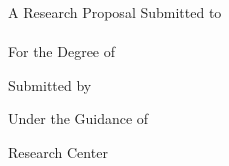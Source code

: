 \makeatletter
\begin{titlepage}
    \begin{center}
        \Large{\textbf{\MakeUppercase{\@title}}}
        
        \vspace{30pt}
        \large
        A Research Proposal Submitted to\\
        \Large
        \textbf{\@institution}\\
        \vspace{30pt}
        \large
        For the Degree of\\
        \Large
        \textbf{\@course}
        
        \vspace{30pt}
        \large
        Submitted by\\
        \Large
        \textbf{\@author}
        
        \vspace{20pt}
        
        \large
        Under the Guidance of\\
        \Large
        \textbf{\@guide}
        
        \vspace{30pt}
        \large
        Research Center\\
        \Large
        \@researchcenter

        \vspace{30pt}
        \textbf{\@date}
    \end{center}
\end{titlepage}
\makeatother